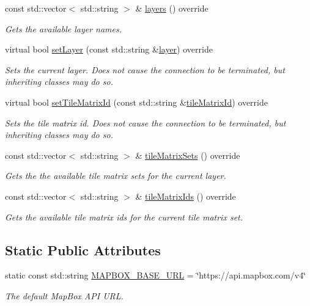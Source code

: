 \begin{DoxyCompactItemize}
const std\+::vector$<$ std\+::string $>$ \& \hyperlink{classdg_1_1deepcore_1_1imagery_1_1_map_box_client_acc5dad6d2a151315a7e3fd9a3e081e72}{layers} () override
\begin{DoxyCompactList}\small\item\em Gets the available layer names. \end{DoxyCompactList}\item 
virtual bool \hyperlink{classdg_1_1deepcore_1_1imagery_1_1_map_box_client_ac06778e9445c7a7843e457bae300900a}{set\+Layer} (const std\+::string \&\hyperlink{group___imagery_module_gafe3e2d18fb0c9ef72b3c23e97ead241f}{layer}) override
\begin{DoxyCompactList}\small\item\em Sets the current layer. Does not cause the connection to be terminated, but inheriting classes may do so. \end{DoxyCompactList}\item 
virtual bool \hyperlink{classdg_1_1deepcore_1_1imagery_1_1_map_box_client_ae83fada50dee68c2491b5c6f3b97b9bb}{set\+Tile\+Matrix\+Id} (const std\+::string \&\hyperlink{group___imagery_module_gae6a1721e1da9ab60ab4e62240baf304b}{tile\+Matrix\+Id}) override
\begin{DoxyCompactList}\small\item\em Sets the tile matrix id. Does not cause the connection to be terminated, but inheriting classes may do so. \end{DoxyCompactList}\item 
const std\+::vector$<$ std\+::string $>$ \& \hyperlink{classdg_1_1deepcore_1_1imagery_1_1_map_box_client_ab2e00c195882421cb7bfc782010b2f96}{tile\+Matrix\+Sets} () override
\begin{DoxyCompactList}\small\item\em Gets the the available tile matrix sets for the current layer. \end{DoxyCompactList}\item 
const std\+::vector$<$ std\+::string $>$ \& \hyperlink{classdg_1_1deepcore_1_1imagery_1_1_map_box_client_a53d5ba0fda2541a4c505bbdd3594e3ab}{tile\+Matrix\+Ids} () override
\begin{DoxyCompactList}\small\item\em Gets the available tile matrix ids for the current tile matrix set. \end{DoxyCompactList}\end{DoxyCompactItemize}
\subsection*{Static Public Attributes}
\begin{DoxyCompactItemize}
\item 
static const std\+::string \hyperlink{group___imagery_module_gae7617429b79fb76140ac754cbe1a52d5}{M\+A\+P\+B\+O\+X\+\_\+\+B\+A\+S\+E\+\_\+\+U\+RL} = \char`\"{}https\+://api.\+mapbox.\+com/v4\char`\"{}
\begin{DoxyCompactList}\small\item\em The default Map\+Box A\+PI U\+RL. \end{DoxyCompactList}\end{DoxyCompactItemize}
